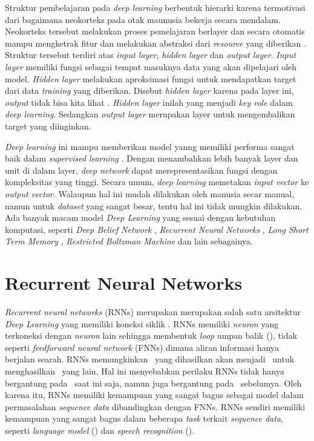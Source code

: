 Struktur pembelajaran pada \textit{deep learning} berbentuk hierarki karena termotivasi dari bagaimana neokorteks pada otak maunusia bekerja secara mendalam. Neokorteks tersebut melakukan proses pemelajaran berlayer dan secara otomatis mampu mengketrak fitur dan melakukan abstraksi dari \textit{resource} yang diberikan \citep{bengio2007scaling}. Struktur tersebut terdiri atas \textit{input layer}, \textit{hidden layer} dan \textit{output layer}. \textit{Input layer} memiliki fungsi sebagai tempat masuknya data yang akan dipelajari oleh model. \textit{Hidden layer} melakukan aproksimasi fungsi untuk mendapatkan target dari data \textit{training} yang diberikan. Disebut \textit{hidden layer} karena pada layer ini, \textit{output} tidak bisa kita lihat \citep{Goodfellow-et-al-2016-Book}. \textit{Hidden layer} inilah yang menjadi \textit{key role} dalam \textit{deep learning}. Sedangkan \textit{output layer} merupakan layer untuk mengembalikan target yang diinginkan.

\textit{Deep learning} ini mampu memberikan model yanng memiliki performa sangat baik dalam \textit{supervised learning} \citep{Goodfellow-et-al-2016-Book}. Dengan menambahkan lebih banyak layer dan unit di dalam layer, \textit{deep network} dapat merepresentasikan fungsi dengan kompleksitas yang tinggi. Secara umum, \textit{deep learning} memetakan \textit{input vector} ke \textit{output vector}. Walaupun hal ini mudah dilakukan oleh manusia secar manual, namun untuk \textit{dataset} yang sangat besar, tentu hal ini tidak mungkin dilakukan. Ada banyak macam model \textit{Deep Learning} yang sesuai dengan kebutuhan komputasi, seperti \textit{Deep Belief Network} \citep{hinton2006fast}, \textit{Recurrent Neural Networks} \citep{elman1990finding}, \textit{Long Short Term Memory} \citep{hochreiter1997long}, \textit{Restricted Boltzman Machine} \citep{pennington2014glove} dan lain sebagainya. 

\section{Recurrent Neural Networks}\label{sec:rnns}

\textit{Recurrent neural networks} (RNNs) merupakan merupakan salah satu arsitektur \textit{Deep Learning} yang memiliki koneksi siklik \citep{graves2012neural}. RNNs memiliki \textit{neuron} yang terkoneksi dengan \textit{neuron} lain sehingga membentuk \textit{loop} umpan balik (\cite{haykin2009neural}), tidak seperti \textit{feedforward neural network} (FNNs) dimana aliran informasi hanya berjalan searah. RNNs memungkinkan \iob~yang dihasilkan akan menjadi \ioa~untuk menghasilkan \iob~yang lain. Hal ini menyebabkan perilaku RNNs tidak hanya bergantung pada \ioa~saat ini saja, namun juga bergantung pada \iob~sebelumya. Oleh karena itu, RNNs memiliki kemampuan yang sangat bagus sebagai model dalam permasalahan \textit{sequence data} dibandingkan dengan FNNs. RNNs sendiri memiliki kemampuan yang sangat bagus dalam beberapa \textit{task} terkait \textit{sequence data}, seperti \textit{language model} (\cite{mikolov2010recurrent}) dan \textit{speech recognition} (\cite{graves2013speech}).

